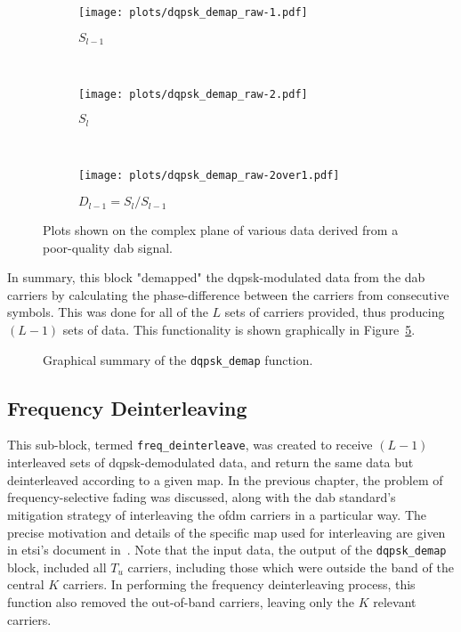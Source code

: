 \documentclass[class=report,11pt,crop=false]{standalone}
\begin{document}
\begin{figure}[htbp]
  \centering
  \captionsetup{type=figure}
  \begin{subfigure}[t]{0.3\textwidth}
    \centering
    \captionsetup{type=figure}
    \texttt{[image: plots/dqpsk\_demap\_raw-1.pdf]}
    \caption{\(S_{l-1}\)}
    \label{fig:dqpsk_demap_raw-1}
  \end{subfigure}%
  ~ 
  \begin{subfigure}[t]{0.3\textwidth}
    \centering
    \captionsetup{type=figure}
    \texttt{[image: plots/dqpsk\_demap\_raw-2.pdf]}
    \caption{\(S_{l}\)}
    \label{fig:dqpsk_demap_raw-2}
  \end{subfigure}
  ~ 
  \begin{subfigure}[t]{0.3\textwidth}
    \centering
    \captionsetup{type=figure}
    \texttt{[image: plots/dqpsk\_demap\_raw-2over1.pdf]}
    \caption{\(D_{l-1} = S_{l}/S_{l-1}\)}
    \label{fig:dqpsk_demap_raw-2over1}
  \end{subfigure}
  \caption{Plots shown on the complex plane of various data derived from a poor-quality \gls{dab} signal.}
  \label{fig:dqpsk_demap_raw}
\end{figure}

In summary, this block "demapped" the \gls{dqpsk}-modulated data from the \gls{dab} carriers by calculating the phase-difference between the carriers from consecutive symbols. This was done for all of the \(L\) sets of carriers provided, thus producing \((L-1)\) sets of data. This functionality is shown graphically in Figure~\ref{fig:dqpsk_demap}.

\begin{figure}[htbp]
  \centering
  \captionsetup{type=figure}
  \def\svgwidth{\linewidth}
  { %
      }
      \caption{Graphical summary of the \texttt{dqpsk\_demap} function.}
  \label{fig:dqpsk_demap}
\end{figure}

\subsection{Frequency Deinterleaving \label{subsect:dab-proc_freq-deinterleave}}
This sub-block, termed \texttt{freq\_deinterleave}, was created to receive \((L-1)\) interleaved sets of \gls{dqpsk}-demodulated data, and return the same data but deinterleaved according to a given map. In the previous chapter, the problem of frequency-selective fading was discussed, along with the \gls{dab} standard's mitigation strategy of interleaving the \gls{ofdm} carriers in a particular way. The precise motivation and details of the specific map used for interleaving are given in \gls{etsi}'s document in~\cite{dabstandard}. Note that the input data, the output of the \texttt{dqpsk\_demap} block, included all \(T_u\) carriers, including those which were outside the band of the central \(K\) carriers. In performing the frequency deinterleaving process, this function also removed the out-of-band carriers, leaving only the \(K\) relevant carriers.
\end{document}
